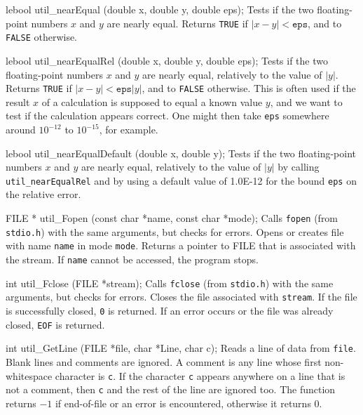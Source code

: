 {{%

\code

lebool util_nearEqual (double x, double y, double eps);
\endcode
 \tab  Tests if the two floating-point numbers $x$ and $y$ are nearly equal.
 Returns {\tt TRUE} if $|x-y| < \texttt{eps}$,
 and to {\tt FALSE} otherwise.
 \endtab
\code

lebool util_nearEqualRel (double x, double y, double eps);
\endcode
 \tab  Tests if the two floating-point numbers $x$ and $y$ are nearly equal,
  relatively to the value of $|y|$.
  Returns {\tt TRUE} if $|x-y| < \texttt{eps} |y|$, and to {\tt FALSE} otherwise.
  This is often used if the result $x$ of a calculation is supposed to equal
	a known value $y$, and we want to test if the calculation appears correct.
	One might then take \texttt{eps} somewhere around $10^{-12}$ to $10^{-15}$, for example.
 \endtab
\code

lebool util_nearEqualDefault (double x, double y);
\endcode
 \tab  Tests if the two floating-point numbers $x$ and $y$ are nearly equal,
  relatively to the value of $|y|$ by calling {\tt util\_nearEqualRel} and by
  using a default value of 1.0E-12 for the bound \texttt{eps} on the relative
  error.
 \endtab
\code

FILE * util_Fopen (const char *name, const char *mode);
\endcode
  \tab
  Calls {\tt fopen} (from {\tt stdio.h}) with the same arguments, but checks for errors.
  Opens or creates file with name {\tt name} in mode {\tt mode}. Returns a pointer to
  FILE that is associated with the stream. If {\tt name} cannot be accessed, the program
  stops.
 \endtab
\code

int util_Fclose (FILE *stream);
\endcode
  \tab
   Calls {\tt fclose} (from {\tt stdio.h}) with the same arguments, but checks for errors.
   Closes the file associated with {\tt stream}. If the file is successfully
   closed, {\tt 0}
   is returned. If an error occurs or the file was already closed, {\tt EOF} is returned.
 \endtab
\code

int util_GetLine (FILE *file, char *Line, char c);
\endcode
  \tab
  Reads a line of data from {\tt file}. Blank lines and comments are
  ignored. A comment is any line whose first non-whitespace character
  is {\tt c}. If the character {\tt c} appears anywhere on a line that is
  not a comment, then  {\tt c} and the rest of the line are ignored too.
  The function returns $-1$ if end-of-file or an error is encountered,
  otherwise it returns 0.
  \endtab
\code

}}
